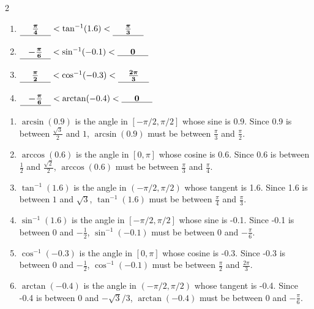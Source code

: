 \documentclass{article}
\begin{document}
\begin{enumerate}[topsep=0pt]
\begin{enumerate}
\begin{multicols}{2}
\begin{enumerate}
      \item
\begin{problem}[0.5in]
$\cfitb[\vphantom{\dfrac{\pi}{3}}]{0.5in}{\frac{\pi}{4}} < \tan^{-1} (1.6) < \cfitb[\vphantom{\dfrac{\pi}{3}}]{0.5in}{\frac{\pi}{3}}$ 
        \end{problem}


      \item
\begin{problem}[0.5in]
$\cfitb[\vphantom{\dfrac{\pi}{3}}]{0.5in}{-\frac{\pi}{6}} < \sin^{-1} (-0.1) < \cfitb[\vphantom{\dfrac{\pi}{3}}]{0.5in}{0}$ 
        \end{problem}

      \item
\begin{problem}[0.5in]
$\cfitb[\vphantom{\dfrac{\pi}{3}}]{0.5in}{\frac{\pi}{2}} < \cos^{-1} (-0.3) < \cfitb[\vphantom{\dfrac{\pi}{3}}]{0.5in}{\frac{2\pi}{3}}$ 
        \end{problem}

      \item
\begin{problem}[0.5in]
$\cfitb[\vphantom{\dfrac{\pi}{3}}]{0.5in}{-\frac{\pi}{6}} < \arctan (-0.4) < \cfitb[\vphantom{\dfrac{\pi}{3}}]{0.5in}{0}$ 
        \end{problem}

\end{enumerate}
\end{multicols}

\begin{solution}
    \begin{enumerate}[label=\roman*.]
        \item $\arcsin(0.9)$ is the angle in $[-\pi/2, \pi/2]$ whose sine is 0.9. Since 0.9 is between $\frac{\sqrt3}{2}$ and $1$, $\arcsin(0.9)$ must be between $\frac{\pi}{3}$ and $\frac{\pi}{2}$.
        \item $\arccos(0.6)$ is the angle in $[0, \pi]$ whose cosine is 0.6. Since 0.6 is between $\frac{1}{2}$ and $\frac{\sqrt{2}}{2}$, $\arccos(0.6)$ must be between $\frac{\pi}{3}$ and $\frac{\pi}{4}$.
        \item $\tan^{-1}(1.6)$ is the angle in $(-\pi/2, \pi/2)$ whose tangent is 1.6. Since 1.6 is between $1$ and $\sqrt{3}$, $\tan^{-1}(1.6)$ must be between $\frac{\pi}{4}$ and $\frac{\pi}{3}$.
        \item $\sin^{-1}(1.6)$ is the angle in $[-\pi/2, \pi/2]$ whose sine is -0.1. Since -0.1 is between $0$ and $-\frac{1}{2}$, $\sin^{-1}(-0.1)$ must be between $0$ and $-\frac{\pi}{6}$.
        \item $\cos^{-1}(-0.3)$ is the angle in $[0, \pi]$ whose cosine is -0.3. Since -0.3 is between $0$ and $-\frac{1}{2}$, $\cos^{-1}(-0.1)$ must be between $\frac{\pi}{2}$ and $\frac{2\pi}{3}$.
        \item $\arctan(-0.4)$ is the angle in $(-\pi/2, \pi/2)$ whose tangent is -0.4. Since -0.4 is between $0$ and $-\sqrt{3}/3$, $\arctan(-0.4)$ must be between $0$ and $-\frac{\pi}{6}$.
    \end{enumerate}
\end{solution}


\end{enumerate}
\end{enumerate}
\end{document}
